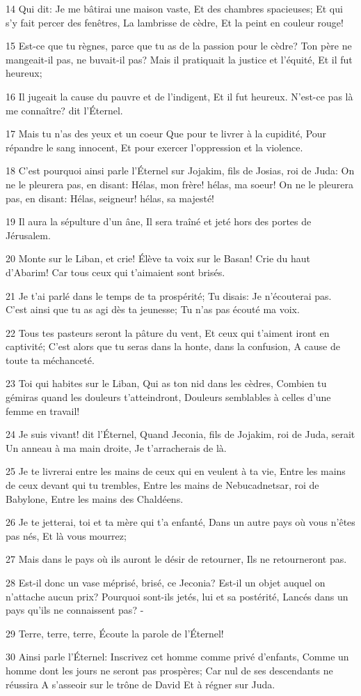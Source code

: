 \par 14 Qui dit: Je me bâtirai une maison vaste, Et des chambres spacieuses; Et qui s'y fait percer des fenêtres, La lambrisse de cèdre, Et la peint en couleur rouge!
\par 15 Est-ce que tu règnes, parce que tu as de la passion pour le cèdre? Ton père ne mangeait-il pas, ne buvait-il pas? Mais il pratiquait la justice et l'équité, Et il fut heureux;
\par 16 Il jugeait la cause du pauvre et de l'indigent, Et il fut heureux. N'est-ce pas là me connaître? dit l'Éternel.
\par 17 Mais tu n'as des yeux et un coeur Que pour te livrer à la cupidité, Pour répandre le sang innocent, Et pour exercer l'oppression et la violence.
\par 18 C'est pourquoi ainsi parle l'Éternel sur Jojakim, fils de Josias, roi de Juda: On ne le pleurera pas, en disant: Hélas, mon frère! hélas, ma soeur! On ne le pleurera pas, en disant: Hélas, seigneur! hélas, sa majesté!
\par 19 Il aura la sépulture d'un âne, Il sera traîné et jeté hors des portes de Jérusalem.
\par 20 Monte sur le Liban, et crie! Élève ta voix sur le Basan! Crie du haut d'Abarim! Car tous ceux qui t'aimaient sont brisés.
\par 21 Je t'ai parlé dans le temps de ta prospérité; Tu disais: Je n'écouterai pas. C'est ainsi que tu as agi dès ta jeunesse; Tu n'as pas écouté ma voix.
\par 22 Tous tes pasteurs seront la pâture du vent, Et ceux qui t'aiment iront en captivité; C'est alors que tu seras dans la honte, dans la confusion, A cause de toute ta méchanceté.
\par 23 Toi qui habites sur le Liban, Qui as ton nid dans les cèdres, Combien tu gémiras quand les douleurs t'atteindront, Douleurs semblables à celles d'une femme en travail!
\par 24 Je suis vivant! dit l'Éternel, Quand Jeconia, fils de Jojakim, roi de Juda, serait Un anneau à ma main droite, Je t'arracherais de là.
\par 25 Je te livrerai entre les mains de ceux qui en veulent à ta vie, Entre les mains de ceux devant qui tu trembles, Entre les mains de Nebucadnetsar, roi de Babylone, Entre les mains des Chaldéens.
\par 26 Je te jetterai, toi et ta mère qui t'a enfanté, Dans un autre pays où vous n'êtes pas nés, Et là vous mourrez;
\par 27 Mais dans le pays où ils auront le désir de retourner, Ils ne retourneront pas.
\par 28 Est-il donc un vase méprisé, brisé, ce Jeconia? Est-il un objet auquel on n'attache aucun prix? Pourquoi sont-ils jetés, lui et sa postérité, Lancés dans un pays qu'ils ne connaissent pas? -
\par 29 Terre, terre, terre, Écoute la parole de l'Éternel!
\par 30 Ainsi parle l'Éternel: Inscrivez cet homme comme privé d'enfants, Comme un homme dont les jours ne seront pas prospères; Car nul de ses descendants ne réussira A s'asseoir sur le trône de David Et à régner sur Juda.

